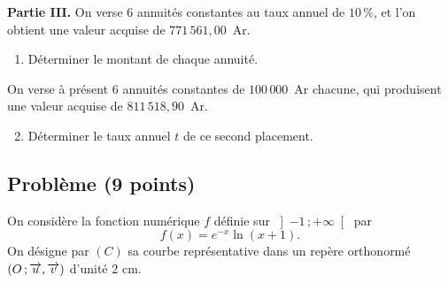 \textbf{Partie III.} On verse $6$ annuités constantes au taux annuel de
$10\,\%$, et l'on obtient une valeur acquise de $771\,561{,}00$~Ar.
\begin{enumerate}[label=\textbf{\alph*)}, leftmargin=*, itemsep=0.15em]
  \item Déterminer le montant de chaque annuité.
\end{enumerate}
On verse à présent $6$ annuités constantes de $100\,000$~Ar chacune, qui
produisent une valeur acquise de $811\,518{,}90$~Ar.
\begin{enumerate}[label=\textbf{\alph*)}, leftmargin=*, itemsep=0.15em]
  \setcounter{enumii}{1}
  \item Déterminer le taux annuel $t$ de ce second placement.
\end{enumerate}

\subsection*{Problème \textnormal{(9 points)}}

On considère la fonction numérique $f$ définie sur $\left]-1\,;+\infty\right[$
par
\[
  f(x) = e^{-x}\ln(x+1) .
\]
On désigne par $(C)$ sa courbe représentative dans un repère orthonormé
$(O\,;\overrightarrow{u},\overrightarrow{v})$ d'unité $2$ cm.

